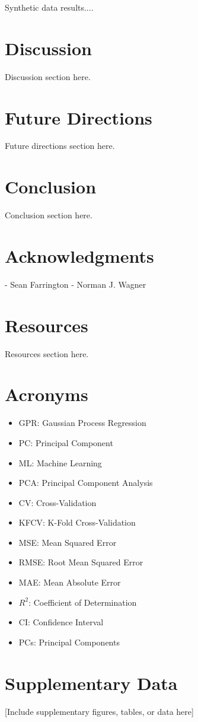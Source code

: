 \documentclass[12pt,letterpaper]{article}
\begin{document}
Synthetic data results....












\newpage
\section{Discussion}
Discussion section here.



\newpage
\section{Future Directions}
Future directions section here.

\newpage
\section{Conclusion}
Conclusion section here.

\newpage
\section{Acknowledgments}

- Sean Farrington
- Norman J. Wagner

\newpage
\section{Resources}
Resources section here.

\newpage
\section{Acronyms}
\begin{itemize}
    \item GPR: Gaussian Process Regression
    \item PC: Principal Component
    \item ML: Machine Learning
    \item PCA: Principal Component Analysis
    \item CV: Cross-Validation
    \item KFCV: K-Fold Cross-Validation
    \item MSE: Mean Squared Error
    \item RMSE: Root Mean Squared Error
    \item MAE: Mean Absolute Error
    \item $R^2$: Coefficient of Determination
    \item CI: Confidence Interval
    \item PCs: Principal Components
\end{itemize}

\newpage

\newpage
\appendix

\section{Supplementary Data}
\label{app:supplementary}

[Include supplementary figures, tables, or data here]
\end{document}

